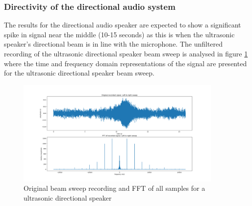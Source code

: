 \newpage

\subsubsection{Directivity of the directional audio system}
The results for the directional audio speaker are expected to show a significant spike in signal near the middle (10-15 seconds) as this is when the ultrasonic speaker's directional beam is in line with the microphone.
The unfiltered recording of the ultrasonic directional speaker beam sweep is analysed in figure \ref{fig:unfiltered_usonic_beamsweep} where the time and frequency domain representations of the signal are presented for the ultrasonic directional speaker beam sweep.
\begin{figure}[ht!]
    \centering
    \includegraphics[width=0.9\textwidth]{Figures/Testing/BeamSweep/Ultrasonic_sqr_am/original_sig_fft_amp.png}
    \caption{Original beam sweep recording and FFT of all samples for a ultrasonic directional speaker}
    \label{fig:unfiltered_usonic_beamsweep}
\end{figure}

